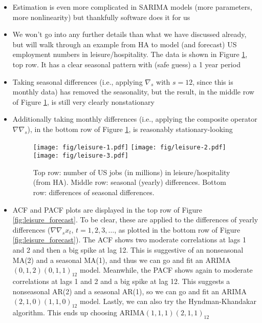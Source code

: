 \documentclass{article}
\begin{document}
\begin{itemize}
\item Estimation is even more complicated in SARIMA models (more parameters, 
  more nonlinearity) but thankfully software does it for us

\item We won't go into any further details than what we have discussed already,
  but will walk through an example from HA to model (and forecast) US
  employment numbers in leisure/hospitality. The data is shown in Figure
  \ref{fig:leisure_exploratory}, top row. It has a clear seasonal pattern with
  (safe guess) a 1 year period  

\item Taking seasonal differences (i.e., applying $\nabla_s$ with $s = 12$,
  since this is monthly data) has removed the seasonality, but the result, in
  the middle row of Figure \ref{fig:leisure_exploratory}, is still very clearly
  nonstationary   

\item Additionally taking monthly differences (i.e., applying the composite 
  operator $\nabla \nabla_s$), in the bottom row of Figure
  \ref{fig:leisure_exploratory}, is reasonably stationary-looking    

\begin{figure}[p]
\centering
\texttt{[image: fig/leisure-1.pdf]}
\texttt{[image: fig/leisure-2.pdf]}
\texttt{[image: fig/leisure-3.pdf]}
\caption{Top row: number of US jobs (in millions) in leisure/hospitality (from
  HA). Middle row: seasonal (yearly) differences. Bottom row: differences of
  seasonal differences.} 
\label{fig:leisure_exploratory}
\end{figure}

\item ACF and PACF plots are displayed in the top row of Figure
  \ref{fig:leisure_forecast}. To be clear, these are applied to the differences
  of yearly differences ($\nabla \nabla_s x_t$, $t = 1,2,3,\dots$, as plotted in
  the bottom row of Figure \ref{fig:leisure_forecast}). The ACF shows two
  moderate correlations at lags 1 and 2 and then a big spike at lag 12. This is
  suggestive of an nonseasonal MA(2) and a seasonal MA(1), and thus we can go
  and fit an ARIMA$(0,1,2)(0,1,1)_{12}$ model. Meanwhile, the PACF shows again
  to moderate correlations at lags 1 and 2 and a big spike at lag 12. This
  suggests a nonseasonal AR(2) and a seasonal AR(1), so we can go and fit an
  ARIMA$(2,1,0)(1,1,0)_{12}$ model. Lastly, we can also try the
  Hyndman-Khandakar algorithm. This ends up choosing ARIMA$(1,1,1)(2,1,1)_{12}$  


\end{itemize}
\end{document}
